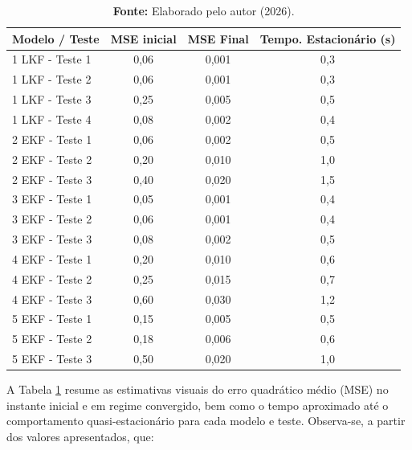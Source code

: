 \documentclass[a4paper,12pt]{article}
\begin{document}
    \begin{table}[H]
    \centering
    \caption{Estimativa do MSE (inicial e convergido) e tempo até quasi-estacionário (Monte Carlo, 10 execuções).}
    \label{tab:mse_montecarlo_estimada}
    \begin{tabular}{l|c|c|c}
    \hline
    \textbf{Modelo / Teste} & \textbf{MSE inicial} & \textbf{MSE Final} & \textbf{Tempo. Estacionário (s)} \\\hline
    1 LKF - Teste 1 & 0,06 & 0,001 & 0,3 \\
    1 LKF - Teste 2 & 0,06 & 0,001 & 0,3 \\
    1 LKF - Teste 3 & 0,25 & 0,005 & 0,5 \\
    1 LKF - Teste 4 & 0,08 & 0,002 & 0,4 \\
    \hline
    2 EKF - Teste 1 & 0,06 & 0,002 & 0,5 \\
    2 EKF - Teste 2 & 0,20 & 0,010 & 1,0 \\
    2 EKF - Teste 3 & 0,40 & 0,020 & 1,5 \\
    \hline
    3 EKF - Teste 1 & 0,05 & 0,001 & 0,4 \\
    3 EKF - Teste 2 & 0,06 & 0,001 & 0,4 \\
    3 EKF - Teste 3 & 0,08 & 0,002 & 0,5 \\
    \hline
    4 EKF - Teste 1 & 0,20 & 0,010 & 0,6 \\
    4 EKF - Teste 2 & 0,25 & 0,015 & 0,7 \\
    4 EKF - Teste 3 & 0,60 & 0,030 & 1,2 \\
    \hline
    5 EKF - Teste 1 & 0,15 & 0,005 & 0,5 \\
    5 EKF - Teste 2 & 0,18 & 0,006 & 0,6 \\
    5 EKF - Teste 3 & 0,50 & 0,020 & 1,0 \\
    \hline
    \end{tabular}
    \caption*{\footnotesize \textbf{Fonte:} Elaborado pelo autor (2026).}
    \end{table}

    A Tabela \ref{tab:mse_montecarlo_estimada} resume as estimativas visuais do erro quadrático médio (MSE) no instante inicial e em regime convergido, bem como o tempo aproximado até o comportamento quasi-estacionário para cada modelo e teste. Observa-se, a partir dos valores apresentados, que:
\end{document}
